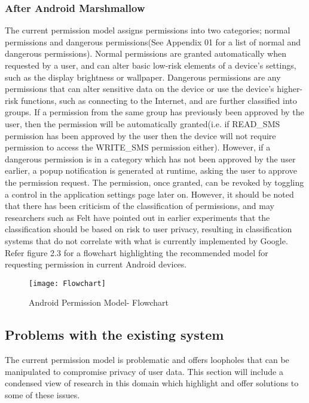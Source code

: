 \subsubsection{After Android Marshmallow}
The current permission model assigns permissions into two categories; normal permissions and dangerous permissions(See Appendix 01 for a list of normal and dangerous permissions). Normal permissions are granted automatically when requested by a user, and can alter basic low-risk elements of a device's settings, such as the display brightness or wallpaper. Dangerous permissions are any permissions that can alter sensitive data on the device or use the device's higher-risk functions, such as connecting to the Internet, and are further classified into groups. If a permission from the same group has previously been approved by the user, then the permission will be automatically granted(i.e. if READ\_SMS permission has been approved by the user then the device will not require permission to access the WRITE\_SMS permission either). However, if a dangerous permission is in a category which has not been approved by the user earlier, a popup notification is generated at runtime, asking the user to approve the permission request. The permission, once granted, can be revoked by toggling a control in the application settings page later on. However, it should be noted that there has been criticism of the classification of permissions, and may researchers such as Felt have pointed out in earlier experiments that the classification should be based on risk to user privacy\cite{felt2011android}, resulting in classification systems that do not correlate with what is currently implemented by Google\cite{androidyearinreview}. Refer figure 2.3 for a flowchart highlighting the recommended model for requesting permission in current Android devices.
\smallskip
\begin{figure}
\texttt{[image: Flowchart]}
\caption{Android Permission Model- Flowchart\cite{flowchartimage}}
\end{figure}
\smallskip 

\subsection{Problems with the existing system}
The current permission model is problematic and offers loopholes that can be manipulated to compromise privacy of user data. This section will include a condensed view of research in this domain which highlight and offer solutions to some of these issues. 

